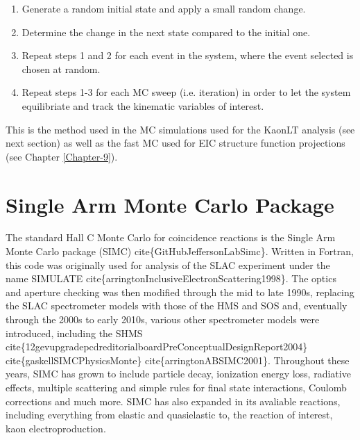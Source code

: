 \documentclass[
]{report}
\begin{document}
\begin{enumerate}
\item Generate a random initial state and apply a small random change.
\item Determine the change in the next state compared to the initial one.
\item Repeat steps 1 and 2 for each event in the system, where the event selected is chosen at random.
\item Repeat steps 1-3 for each MC sweep (i.e. iteration) in order to let the system equilibriate and track the kinematic variables of interest.
\end{enumerate}

\noindent This is the method used in the MC simulations used for the
KaonLT analysis (see next section) as well as the fast MC used for EIC
structure function projections (see Chapter \ref{Chapter-9}).

\hypertarget{Section-6.1}{%
\section{Single Arm Monte Carlo Package}\label{Section-6.1}}

The standard Hall C Monte Carlo for coincidence reactions is the Single
Arm Monte Carlo package (SIMC) cite\{GitHubJeffersonLabSimc\}. Written
in Fortran, this code was originally used for analysis of the SLAC
experiment under the name SIMULATE
cite\{arringtonInclusiveElectronScattering1998\}. The optics and
aperture checking was then modified through the mid to late 1990s,
replacing the SLAC spectrometer models with those of the HMS and SOS
and, eventually through the 2000s to early 2010s, various other
spectrometer models were introduced, including the SHMS
cite\{12gevupgradepcdreditorialboardPreConceptualDesignReport2004\}
cite\{gaskellSIMCPhysicsMonte\} cite\{arringtonABSIMC2001\}. Throughout
these years, SIMC has grown to include particle decay, ionization energy
loss, radiative effects, multiple scattering and simple rules for final
state interactions, Coulomb corrections and much more. SIMC has also
expanded in its avaliable reactions, including everything from elastic
and quasielastic to, the reaction of interest, kaon electroproduction.
\end{document}
